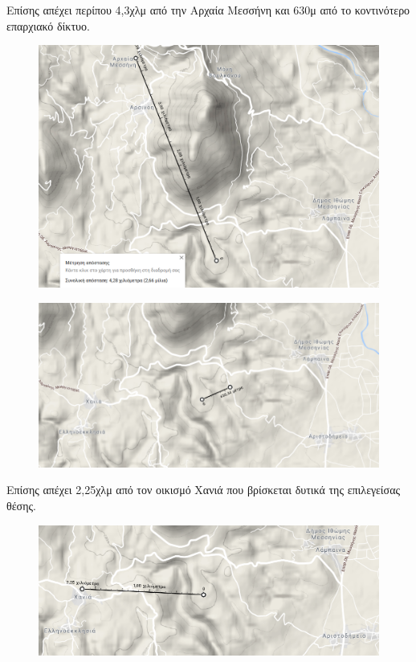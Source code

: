 \documentclass[12pt]{article}
\begin{document}
	Επίσης απέχει περίπου 4,3χλμ από την Αρχαία Μεσσήνη και 630μ από το κοντινότερο επαρχιακό δίκτυο.
	
	\begin{figure} [H]
		\begin{center}
			\includegraphics [scale = 0.35] {map19.png}
		\end{center}
	\end{figure}

	\begin{figure} [H]
		\begin{center}
			\includegraphics [scale = 1] {map20.png}
		\end{center}
	\end{figure}

	Επίσης απέχει 2,25χλμ από τον οικισμό Χανιά που βρίσκεται δυτικά της επιλεγείσας θέσης.
	
	\begin{figure} [H]
		\begin{center}
			\includegraphics [scale = 0.70] {map21.png}
		\end{center}
	\end{figure}
\end{document}
